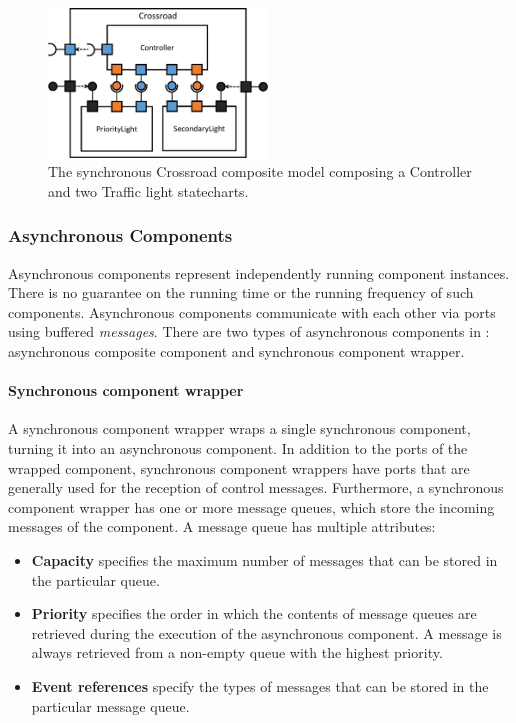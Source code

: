 \begin{figure}[!h]
	\centering
	\includegraphics[width=0.52\textwidth]{figures/Controller-gcd.pdf}
	\caption{The synchronous Crossroad composite model composing a Controller and two Traffic light statecharts.}
	\label{fig:crossroads-composite-model}
\end{figure}

\subsubsection{Asynchronous Components}
Asynchronous components represent independently running
component instances. There is no guarantee on the running time or the running frequency of such components. Asynchronous components communicate with each other via ports using buffered \emph{messages}. There are two types of asynchronous components in \gamma: asynchronous composite component and synchronous component wrapper.
\paragraph{Synchronous component wrapper} A synchronous component wrapper wraps a single synchronous component, turning it into an asynchronous component. In addition to the ports of the wrapped component, synchronous component wrappers have ports that are generally used for the reception of control messages. Furthermore, a synchronous component wrapper has one or more
message queues, which store the incoming messages of the component. A message queue has multiple attributes:
\begin{itemize}
	\item \textbf{Capacity} specifies the maximum number of messages that can be stored in the particular
	queue.
	\item \textbf{Priority} specifies the order in which the contents of message queues are retrieved during
	the execution of the asynchronous component. A message is always retrieved from a
	non-empty queue with the highest priority.
	\item \textbf{Event references} specify the types of messages that can be stored in the particular message queue.
\end{itemize}

